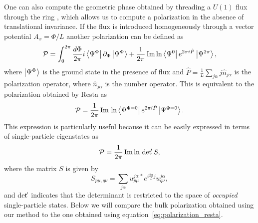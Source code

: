 \documentclass[twocolumn,amsmath,longbibliography,amssymb,superscriptaddress]{revtex4-1}
\begin{document}
One can also compute the geometric phase obtained by threading a $U(1)$ flux through the ring \cite{Watanabe2018}, which allows us to compute a polarization in the absence of translational invariance. If the flux is introduced homogeneously through a vector potential $A_x = \Phi/L$ another polarization can be defined as
\begin{equation}
\mathcal{P} = \int_0^{2\pi}\frac{d\Phi}{2\pi} i\bra{\Psi^\Phi}\partial_\Phi \ket{\Psi^\Phi} + \frac{1}{2\pi}\Im\ln \bra{\Psi^0}e^{2\pi i \hat{P}} \ket{\Psi^{2\pi}}, 
\end{equation}
where $\ket{\Psi^{\Phi}}$ is the ground state in the presence of flux and $\hat{P}=\frac{1}{L}\sum_{j\alpha} j\hat{n}_{j\alpha}$ is the polarization operator, where $\hat{n}_{j\alpha}$ is the number operator. This is equivalent to the polarization obtained by Resta \cite{Resta1997} as
\begin{align}
\mathcal{P} = \frac{1}{2\pi} \Im \,\ln\bra{\Psi^{\Phi=0}}e^{2\pi i \hat{P}}\ket{\Psi^{\Phi=0}}.
\end{align}
This expression is particularly useful because it can be easily expressed in terms of single-particle eigenstates as
\begin{align}
\mathcal{P} = \frac{1}{2\pi}\Im \ln \, {\rm det }\!' \, S,
\label{eq:polarization_resta}
\end{align}
where the matrix $S$ is given by
\begin{equation}
S_{p\mu,q\nu} = \sum_{j\alpha} u_{p\mu}^{j \alpha \, \ast} e^{i\frac{2\pi}{L}j}u_{q\nu}^{j \alpha},
\end{equation}
and  ${\rm det }\!' $ indicates that the determinant is restricted to the space of \emph{occupied} single-particle states. Below we will compare the bulk polarization obtained using our method to the one obtained using equation~\eqref{eq:polarization_resta}.
\end{document}
